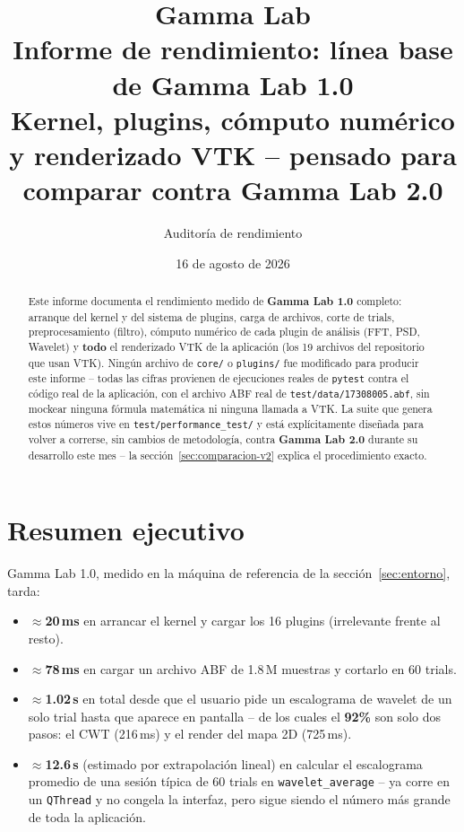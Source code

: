 \documentclass[11pt,a4paper]{article}
\title{\textbf{Gamma Lab}\\[4pt]\large Informe de rendimiento: línea base de Gamma Lab 1.0\\
\large Kernel, plugins, cómputo numérico y renderizado VTK -- pensado para comparar contra Gamma Lab 2.0}
\author{Auditoría de rendimiento}
\date{16 de agosto de 2026}
\begin{document}
\maketitle
\thispagestyle{empty}

\begin{abstract}
\noindent
Este informe documenta el rendimiento medido de \textbf{Gamma Lab 1.0} completo: arranque del kernel y del
sistema de plugins, carga de archivos, corte de trials, preprocesamiento (filtro), cómputo numérico de cada
plugin de análisis (FFT, PSD, Wavelet) y \textbf{todo} el renderizado VTK de la aplicación (los 19 archivos
del repositorio que usan VTK). Ningún archivo de \texttt{core/} o \texttt{plugins/} fue modificado para
producir este informe -- todas las cifras provienen de ejecuciones reales de \texttt{pytest} contra el
código real de la aplicación, con el archivo ABF real de \texttt{test/data/17308005.abf}, sin mockear
ninguna fórmula matemática ni ninguna llamada a VTK. La suite que genera estos números vive en
\texttt{test/performance\_\allowbreak test/} y está explícitamente diseñada para volver a correrse, sin
cambios de metodología, contra \textbf{Gamma Lab 2.0} durante su desarrollo este mes -- la
sección~\ref{sec:comparacion-v2} explica el procedimiento exacto.
\end{abstract}

\tableofcontents
\newpage

\section{Resumen ejecutivo}

Gamma Lab 1.0, medido en la máquina de referencia de la sección~\ref{sec:entorno}, tarda:

\begin{itemize}[nosep]
  \item \textbf{$\approx$20\,ms} en arrancar el kernel y cargar los 16 plugins (irrelevante frente al resto).
  \item \textbf{$\approx$78\,ms} en cargar un archivo ABF de 1.8\,M muestras y cortarlo en 60 trials.
  \item \textbf{$\approx$1.02\,s} en total desde que el usuario pide un escalograma de wavelet de un solo
        trial hasta que aparece en pantalla -- de los cuales el \textbf{92\%} son solo dos pasos: el CWT
        (216\,ms) y el render del mapa 2D (725\,ms).
  \item \textbf{$\approx$12.6\,s} (estimado por extrapolación lineal) en calcular el escalograma promedio de
        una sesión típica de 60 trials en \texttt{wavelet\_\allowbreak average} -- ya corre en un
        \texttt{QThread} y no congela la interfaz, pero sigue siendo el número más grande de toda la
        aplicación.
\end{itemize}
\end{document}
